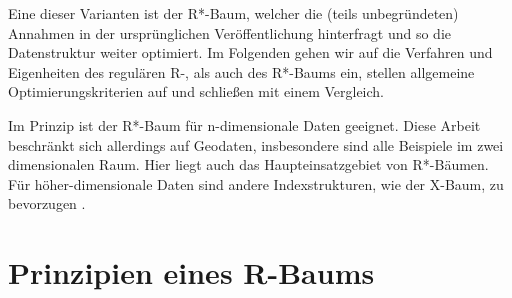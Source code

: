 \documentclass[runningheads,a4paper]{llncs}
\begin{document}
	Eine dieser Varianten ist der R*-Baum, welcher die (teils unbegründeten) Annahmen in der ursprünglichen Veröffentlichung hinterfragt und so die Datenstruktur weiter optimiert. Im Folgenden gehen wir auf die Verfahren und Eigenheiten des regulären R-, als auch des R*-Baums ein, stellen allgemeine Optimierungskriterien auf und schließen mit einem Vergleich.

	Im Prinzip ist der R*-Baum für n-dimensionale Daten geeignet. Diese Arbeit beschränkt sich allerdings auf Geodaten, insbesondere sind alle Beispiele im zwei dimensionalen Raum. Hier liegt auch das Haupteinsatzgebiet von R*-Bäumen. Für höher-dimensionale Daten sind andere Indexstrukturen, wie der X-Baum, zu bevorzugen \citep[vgl.][28-29]{Kriegel:1996}.


\section{Prinzipien eines R-Baums} %
\label{sec:prinzipien_eines_r_baums}
\end{document}
